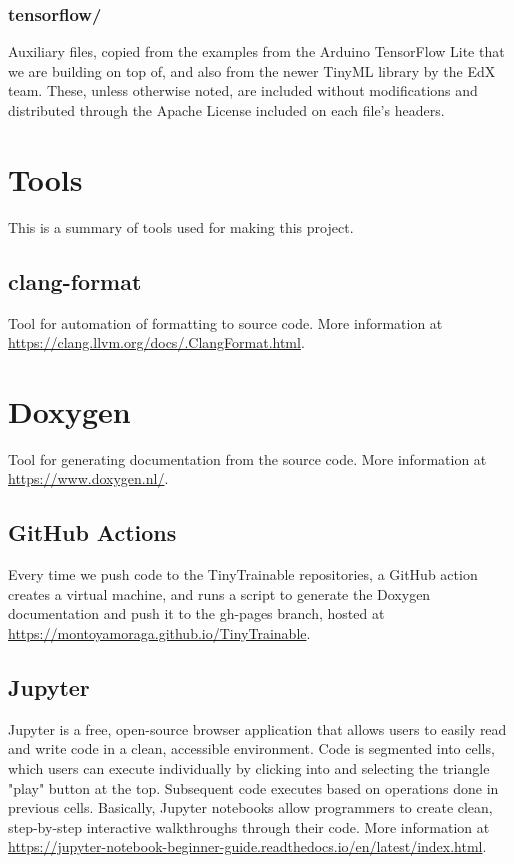 \subsubsection{tensorflow/}

Auxiliary files, copied from the examples from the Arduino TensorFlow Lite that we are building on top of, and also from the newer TinyML library by the EdX team. These, unless otherwise noted, are included without modifications and distributed through the Apache License included on each file's headers.

\section{Tools}

This is a summary of tools used for making this project.

\subsection{clang-format}

Tool for automation of formatting to source code. More information at \url{https://clang.llvm.org/docs/.ClangFormat.html}.

\section{Doxygen}

Tool for generating documentation from the source code. More information at \url{https://www.doxygen.nl/}.

\subsection{GitHub Actions}

Every time we push code to the TinyTrainable repositories, a GitHub action creates a virtual machine, and runs a script to generate the Doxygen documentation and push it to the gh-pages branch, hosted at \url{https://montoyamoraga.github.io/TinyTrainable}.

\subsection{Jupyter}

Jupyter is a free, open-source browser application that allows users to easily read and write code in a clean, accessible environment. Code is segmented into cells, which users can execute individually by clicking into and selecting the triangle "play" button at the top. Subsequent code executes based on operations done in previous cells. Basically, Jupyter notebooks allow programmers to create clean, step-by-step interactive walkthroughs through their code. More information at \url{https://jupyter-notebook-beginner-guide.readthedocs.io/en/latest/index.html}.
